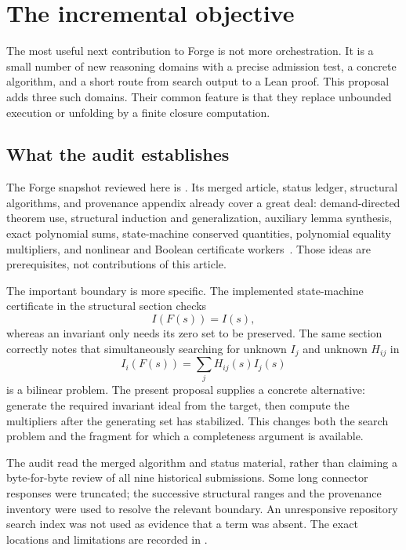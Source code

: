 \section{The incremental objective}
\label{sec:objective}

The most useful next contribution to Forge is not more orchestration. It is a
small number of new reasoning domains with a precise admission test, a concrete
algorithm, and a short route from search output to a Lean proof. This proposal
adds three such domains. Their common feature is that they replace unbounded
execution or unfolding by a finite closure computation.

\subsection{What the audit establishes}

The Forge snapshot reviewed here is
. Its merged article, status ledger,
structural algorithms, and provenance appendix already cover a great deal:
demand-directed theorem use, structural induction and generalization, auxiliary
lemma synthesis, exact polynomial sums, state-machine conserved quantities,
polynomial equality multipliers, and nonlinear and Boolean certificate
workers~\cite{forge,forge-structural,forge-status,forge-provenance}. Those ideas
are prerequisites, not contributions of this article.

The important boundary is more specific. The implemented state-machine
certificate in the structural section checks
\[
 I(F(s))=I(s),
\]
whereas an invariant only needs its zero set to be preserved. The same section
correctly notes that simultaneously searching for unknown $I_j$ and unknown
$H_{ij}$ in
\[
 I_i(F(s))=\sum_j H_{ij}(s)I_j(s)
\]
is a bilinear problem. The present proposal supplies a concrete alternative:
generate the required invariant ideal from the target, then compute the
multipliers after the generating set has stabilized. This changes both the
search problem and the fragment for which a completeness argument is available.

The audit read the merged algorithm and status material, rather than claiming
a byte-for-byte review of all nine historical submissions. Some long connector
responses were truncated; the successive structural ranges and the provenance
inventory were used to resolve the relevant boundary. An unresponsive repository
search index was not used as evidence that a term was absent. The exact locations
and limitations are recorded in .

